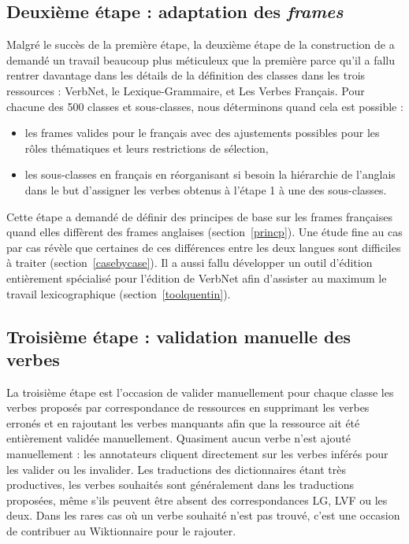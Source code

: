 \subsection{Deuxième étape : adaptation des \textit{frames}}\label{second}

Malgré le succès de la première étape, la deuxième étape de la construction de
\verbenet{} a demandé un travail beaucoup plus méticuleux que la première parce
qu'il a fallu rentrer davantage dans les détails de la définition des classes
dans les trois ressources : VerbNet, le Lexique-Grammaire, et Les Verbes
Français. Pour chacune des 500 classes et sous-classes, nous déterminons quand
cela est possible :

\begin{itemize}
    \item les frames valides pour le français avec des ajustements possibles
        pour les rôles thématiques et leurs restrictions de sélection,
    \item les sous-classes en français en réorganisant si besoin la hiérarchie
        de l'anglais dans le but d'assigner les verbes obtenus à l'étape 1 à
        une des sous-classes.
\end{itemize}

Cette étape a demandé de définir des principes de base sur les frames
françaises quand elles diffèrent des frames anglaises (section~\ref{princp}).
Une étude fine au cas par cas révèle que certaines de ces différences entre les
deux langues sont difficiles à traiter (section~\ref{casebycase}). Il a aussi
fallu développer un outil d'édition entièrement spécialisé pour l'édition de
VerbNet afin d'assister au maximum le travail lexicographique
(section~\ref{toolquentin}).

\subsection{Troisième étape : validation manuelle des verbes}
\label{third}

La troisième étape est l'occasion de valider manuellement pour chaque classe
les verbes proposés par correspondance de ressources en supprimant les verbes
erronés et en rajoutant les verbes manquants afin que la ressource ait été
entièrement validée manuellement. Quasiment aucun verbe n'est ajouté
manuellement : les annotateurs cliquent directement sur les verbes inférés pour
les valider ou les invalider.  Les traductions des dictionnaires étant très
productives, les verbes souhaités sont généralement dans les traductions
proposées, même s'ils peuvent être absent des correspondances LG, LVF ou les
deux. Dans les rares cas où un verbe souhaité n'est pas trouvé, c'est une
occasion de contribuer au Wiktionnaire pour le rajouter.

